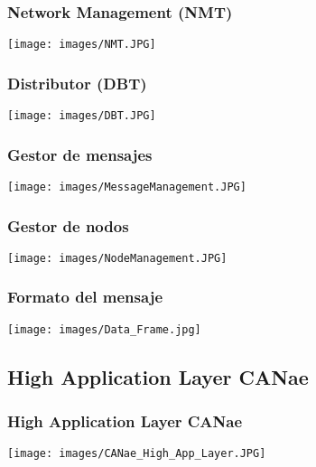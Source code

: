 \begin{frame}
	\frametitle{Network Management (NMT)}
	\centering
	\texttt{[image: images/NMT.JPG]}
\end{frame}

\begin{frame}
	\frametitle{Distributor (DBT)}
	\centering
	\texttt{[image: images/DBT.JPG]}
\end{frame}


\begin{frame}
	\frametitle{Gestor de mensajes}
	\centering
	\texttt{[image: images/MessageManagement.JPG]}
\end{frame}

\begin{frame}
	\frametitle{Gestor de nodos}
	\centering
	\texttt{[image: images/NodeManagement.JPG]}
\end{frame}

\begin{frame}
	\frametitle{Formato del mensaje}
	\centering
	\texttt{[image: images/Data\_Frame.jpg]}
\end{frame}

\subsection{High Application Layer CANae}
\begin{frame}
	\frametitle{High Application Layer CANae}
	\centering
	\texttt{[image: images/CANae\_High\_App\_Layer.JPG]}
\end{frame}